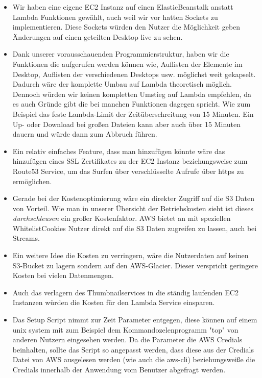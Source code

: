 \documentclass[a4paper, 12pt]{scrreprt}
\renewcommand\_{\textunderscore\allowbreak}
\begin{document}
\begin{itemize}
\item Wir haben eine eigene EC2 Instanz auf einen ElasticBeanstalk anstatt Lambda Funktionen gewählt, auch weil wir vor hatten Sockets zu implementieren. Diese Sockets würden den Nutzer die Möglichkeit geben Änderungen auf einen geteilten Desktop live zu sehen. 
\item Dank unserer vorausschauenden Programmierstruktur, haben wir die Funktionen die aufgerufen werden können wie, Auflisten der Elemente im Desktop, Auflisten der verschiedenen Desktops usw. möglichst weit gekapselt. Dadurch wäre der komplette Umbau auf Lambda theoretisch möglich. Dennoch würden wir keinen kompletten Umstieg auf Lambda empfehlen, da es auch Gründe gibt die bei manchen Funktionen dagegen spricht. Wie zum Beispiel das feste Lambda-Limit der Zeitüberschreitung von 15 Minuten. Ein Up- oder Download bei großen Dateien kann aber auch über 15 Minuten dauern und würde dann zum Abbruch führen.
\item Ein relativ einfaches Feature, dass man hinzufügen könnte wäre das hinzufügen eines SSL Zertifikates zu der EC2 Instanz beziehungsweise zum Route53 Service, um das Surfen über verschlüsselte Aufrufe über https zu ermöglichen. 
\item Gerade bei der Kostenoptimierung wäre ein direkter Zugriff auf die S3 Daten von Vorteil. Wie man in unserer Übersicht der Betriebskosten sieht ist dieses \emph{durchschleusen} ein großer Kostenfaktor. AWS bietet an mit speziellen \glqq Whitelist\grqq  Cookies Nutzer direkt auf die S3 Daten zugreifen zu lassen, auch bei Streams.
\item Ein weitere Idee die Kosten zu verringern, wäre die Nutzerdaten auf keinen S3-Bucket zu lagern sondern auf den AWS-Glacier. Dieser verspricht geringere Kosten bei vielen Datenmengen.
\item Auch das verlagern des Thumbnailservices in die ständig laufenden EC2 Instanzen würden die Kosten für den Lambda Service einsparen.
\item Das Setup Script nimmt zur Zeit Parameter entgegen, diese können auf einem unix system mit zum Beispiel dem Kommandozelenprogramm "top" von anderen Nutzern eingesehen werden. Da die Parameter die AWS Credials beinhalten, sollte das Script so angepasst werden, dass diese aus der Credials Datei von AWS ausgelesen werden (wie auch die aws-cli) beziehungsweiße die Credials innerhalb der Anwendung vom Benutzer abgefragt werden.
\end{itemize}


\clearpage


%
\end{document}
